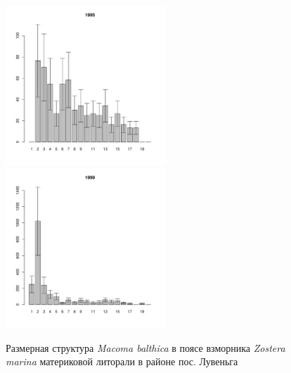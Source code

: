 \begin{figure}[h]
\begin{multicols}{3}
\hfill
\includegraphics[width=60mm]{../White_Sea/Luvenga_II_razrez/zostera_zone_1995_.pdf}
\hfill
\includegraphics[width=60mm]{../White_Sea/Luvenga_II_razrez/zostera_zone_1999_.pdf}

\end{multicols}


\caption{Размерная структура {\it Macoma balthica} в поясе взморника {\it Zostera marina} материковой литорали в районе пос. Лувеньга}
\label{ris:size_str_2razrez_zostera}
\end{figure}

